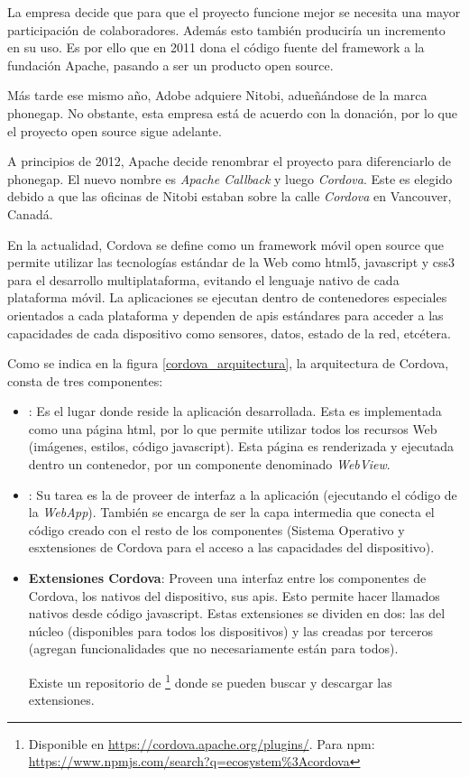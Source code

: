 La empresa decide que para que el proyecto funcione mejor se necesita una mayor participación de colaboradores. Además esto también produciría un incremento en su uso. Es por ello que en 2011 dona el código fuente del \gls{framework} a la fundación Apache, pasando a ser un producto \gls{open source}.

Más tarde ese mismo año, Adobe adquiere Nitobi, adueñándose de la marca \gls{phonegap}. No obstante, esta empresa está de acuerdo con la donación, por lo que el proyecto \gls{open source} sigue adelante.

A principios de 2012, Apache decide renombrar el proyecto para diferenciarlo de \gls{phonegap}. El nuevo nombre es \textit{Apache Callback} y luego \textit{Cordova}. Este es elegido debido a que las oficinas de Nitobi estaban sobre la calle \textit{Cordova} en Vancouver, Canadá.

En la actualidad, Cordova se define como un \gls{framework} móvil \gls{open source} que permite utilizar las tecnologías estándar de la Web como \gls{html}5, \gls{javascript} y \gls{css}3 para el desarrollo multiplataforma, evitando el lenguaje nativo de cada plataforma móvil. La aplicaciones se ejecutan dentro de contenedores especiales orientados a cada plataforma y dependen de \glspl{api} estándares para acceder a las capacidades de cada dispositivo como sensores, datos, estado de la red, etcétera.\cite{apache2017cordovaOverview}

Como se indica en la figura \ref{cordova_arquitectura}, la arquitectura de Cordova, consta de tres componentes:
\begin{itemize}
\item \textbf{}: Es el lugar donde reside la aplicación desarrollada. Esta es implementada como una página \gls{html}, por lo que permite utilizar todos los recursos Web (imágenes, estilos, código \gls{javascript}). Esta página es renderizada y ejecutada dentro un contenedor, por un componente denominado \textit{WebView}.
\item \textbf{}: Su tarea es la de proveer de interfaz a la aplicación (ejecutando el código de la \textit{WebApp}). También se encarga de ser la capa intermedia que conecta el código creado con el resto de los componentes (Sistema Operativo y esxtensiones de Cordova para el acceso a las capacidades del dispositivo).
\item \textbf{Extensiones Cordova}: Proveen una interfaz entre los componentes de Cordova, los nativos del dispositivo, sus \glspl{api}. Esto permite hacer llamados nativos desde código \gls{javascript}. Estas extensiones se dividen en dos: las del núcleo (disponibles para todos los dispositivos) y las creadas por terceros (agregan funcionalidades que no necesariamente están para todos).

Existe un repositorio de \footnote{Disponible en \url{https://cordova.apache.org/plugins/}. Para npm:  \url{https://www.npmjs.com/search?q=ecosystem\%3Acordova}} donde se pueden buscar y descargar las extensiones.
\end{itemize}


